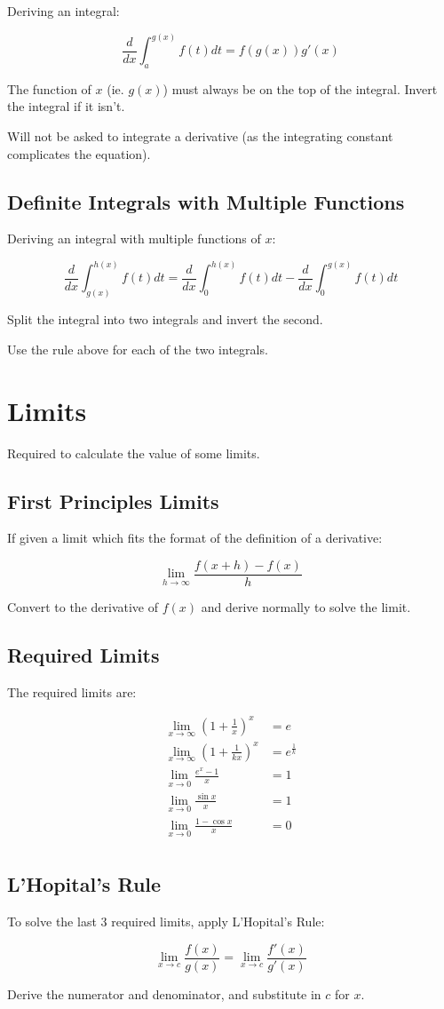 \documentclass[a4paper,11pt]{article}
\begin{document}
Deriving an integral:

$$
\frac{d}{dx} \int_a^{g(x)} f(t) dt = f(g(x)) g'(x)
$$

The function of $x$ (ie. $g(x)$) must always be on the top of the integral.
Invert the integral if it isn't.

Will not be asked to integrate a derivative (as the integrating constant
complicates the equation).


\subsection{Definite Integrals with Multiple Functions}

Deriving an integral with multiple functions of $x$:

$$
\frac{d}{dx} \int_{g(x)}^{h(x)} f(t) dt = \frac{d}{dx} \int_{0}^{h(x)} f(t) dt - \frac{d}{dx} \int_{0}^{g(x)} f(t) dt
$$

Split the integral into two integrals and invert the second.

Use the rule above for each of the two integrals.




\section{Limits}

Required to calculate the value of some limits.


\subsection{First Principles Limits}

If given a limit which fits the format of the definition of a derivative:

$$
\lim_{h \to \infty} \frac{f(x + h) - f(x)}{h}
$$

Convert to the derivative of $f(x)$ and derive normally to solve the limit.


\subsection{Required Limits}

The required limits are:

$$
\begin{aligned}
\lim_{x \to \infty} (1 + \frac{1}{x})^x & = e \\
\lim_{x \to \infty} (1 + \frac{1}{kx})^x & = e^{\frac{1}{k}} \\
\lim_{x \to 0} \frac{e^x - 1}{x} & = 1 \\
\lim_{x \to 0} \frac{\sin{x}}{x} & = 1 \\
\lim_{x \to 0} \frac{1 - \cos{x}}{x} & = 0 \\
\end{aligned}
$$


\subsection{L'Hopital's Rule}

To solve the last 3 required limits, apply L'Hopital's Rule:

$$
\lim_{x \to c} \frac{f(x)}{g(x)} = \lim_{x \to c} \frac{f'(x)}{g'(x)}
$$

Derive the numerator and denominator, and substitute in $c$ for $x$.
\end{document}
